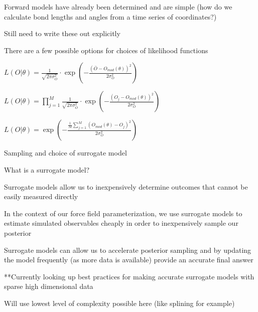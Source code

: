 \documentclass{report}
\begin{document}
\begin{outline}
\begin{outline}
\begin{outline}
\begin{outline}
        \item{Forward models have already been determined and are simple (how do we calculate bond lengths and angles from a time series of coordinates?)}
        \begin{outline}
          \item{Still need to write these out explicitly}
        \end{outline}
        \item{There are a few possible options for choices of likelihood functions}
        \begin{outline}
          \item{$L\left(O|\theta\right) = \frac{1}{\sqrt{2\pi\sigma_O^2}} \cdot \exp\left(-\frac{\left(\bar{O} - O_{mod}\left(\theta\right)\right)^2}{2
                   \sigma_O^2}\right)$}
          \item{$L\left(O|\theta\right) = \prod_{j=1}^M \frac{1}{\sqrt{2\pi\sigma_O^2}} \cdot \exp\left(-\frac{\left(O_j - O_{mod}\left(\theta\right)
                  \right)^2}{2\sigma_O^2}\right)$}
          \item{$L\left(O|\theta\right) = \exp\left(-\frac{\frac{1}{M} \sum_{j=1}^M \left(O_{mod}\left(\theta\right) - O_j\right)^2}{2\sigma_O^2}\right)$}
        \end{outline}
      \end{outline}
      \item{Sampling and choice of surrogate model}
      \begin{outline}
        \item{What is a surrogate model?}
        \begin{outline}
          \item{Surrogate models allow us to inexpensively determine outcomes that cannot be easily measured directly}
          \item{In the context of our force field parameterization, we use surrogate models to estimate simulated observables cheaply in order to 
		  inexpensively sample our posterior}
          \item{Surrogate models can allow us to accelerate posterior sampling and by updating the model frequently (as more data is available) provide an 
                  accurate final answer}
          \item{**Currently looking up best practices for making accurate surrogate models with sparse high dimensional data}
          \item{Will use lowest level of complexity possible here (like splining for example)}

\end{outline}
\end{outline}
\end{outline}
\end{outline}
\end{outline}
\end{document}
